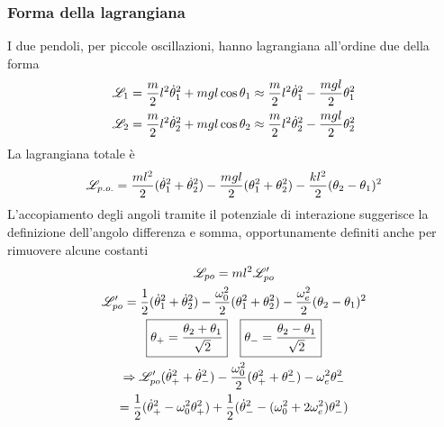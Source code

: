 \documentclass[Main.tex]{subfiles}
\begin{document}
\begin{tema}
	\subsubsection*{Forma della lagrangiana}
	I due pendoli, per piccole oscillazioni, hanno lagrangiana all'ordine due della forma
	\begin{gather}
		\mathscr{L}_1= \frac{m}{2} l^2 \dot \theta_1^2 + mgl \cos \theta_1 \approx \frac{m}{2} l^2 \dot \theta^2_1 - \frac{mgl}{2} \theta_1^2\\
		\mathscr{L}_2= \frac{m}{2} l^2 \dot \theta_2^2 + mgl \cos \theta_2 \approx \frac{m}{2} l^2 \dot \theta^2_2 - \frac{mgl}{2} \theta_2^2
	\end{gather}
	La lagrangiana totale è
	\begin{gather}
		\mathscr{L}_{p.o.} = \frac{ml^2}{2} ( \dot \theta_1^2 + \dot \theta_2^2) - \frac{mgl}{2} ( \theta_1^2 + \theta_2^2) - \frac{kl^2}{2} ( \theta_2-\theta_1)^2
	\end{gather}
	L'accopiamento degli angoli tramite il potenziale di interazione suggerisce la definizione dell'angolo differenza e somma, opportunamente definiti anche per rimuovere alcune costanti
	\begin{gather}
		\L_{po} = ml^2 \L_{po}'\\
		\L_{po}' = \frac{1}{2} ( \dot \theta^2_1 + \dot \theta_2^2 ) - \frac{\omega_0^2}{2}  (\theta_1^2+ \theta_2^2) - \frac{\omega_e^2}{2} (\theta_2- \theta_1)^2\\
		\boxed{\theta_+ = \frac{\theta_2+ \theta_1}{\sqrt{2}}} \ \ \ \boxed{\theta_-=\frac{\theta_2-\theta_1}{\sqrt{2}}}\\
		\Rightarrow  \L'_{po} (\dot \theta_+^2 + \dot \theta_-^2) - \frac{\omega_0^2}{2} ( \theta_+ ^2 + \theta_-^2) - \omega_e^2 \theta_-^2\\
		= \frac{1}{2} ( \dot \theta_+^2 - \omega_0^2 \theta_+^2) + \frac{1}{2} ( \dot \theta_-^2 - (\omega_0^2 + 2 \omega_e^2) \theta_-^2)
	\end{gather} 
	

\end{tema}
\end{document}
